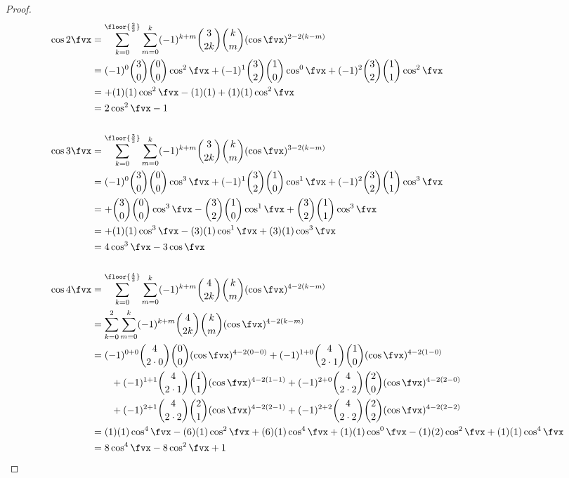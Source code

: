 \begin{proof}
\begin{align*}
  \cos2\fvx
    &= \sum_{k=0}^\floor{\frac{2}{2}}\sum_{m=0}^k      
         (-1)^{k+m} \binom{3}{2k}\binom{k}{m}(\cos\fvx)^{2-2(k-m)}
  \\&= (-1)^0 \binom{3}{0}\binom{0}{0}\cos^2\fvx +
       (-1)^1 \binom{3}{2}\binom{1}{0}\cos^0\fvx +
       (-1)^2 \binom{3}{2}\binom{1}{1}\cos^2\fvx
  \\&= + (1)(1)\cos^2\fvx 
       - (1)(1) 
       + (1)(1)\cos^2\fvx
  \\&= 2\cos^2\fvx -1
\\
\\
  \cos3\fvx
    &= \sum_{k=0}^\floor{\frac{3}{2}}\sum_{m=0}^k      
         (-1)^{k+m} \binom{3}{2k}\binom{k}{m}(\cos\fvx)^{3-2(k-m)}
  \\&= (-1)^0 \binom{3}{0}\binom{0}{0}\cos^3\fvx +
       (-1)^1 \binom{3}{2}\binom{1}{0}\cos^1\fvx +
       (-1)^2 \binom{3}{2}\binom{1}{1}\cos^3\fvx
  \\&= + \binom{3}{0}\binom{0}{0}\cos^3\fvx 
       - \binom{3}{2}\binom{1}{0}\cos^1\fvx 
       + \binom{3}{2}\binom{1}{1}\cos^3\fvx
  \\&= + (1)(1)\cos^3\fvx 
       - (3)(1)\cos^1\fvx 
       + (3)(1)\cos^3\fvx
  \\&= 4\cos^3\fvx - 3\cos\fvx 
\\
\\
  \cos4\fvx
    &= \sum_{k=0}^\floor{\frac{4}{2}}\sum_{m=0}^k      
         (-1)^{k+m} \binom{4}{2k}\binom{k}{m}(\cos\fvx)^{4-2(k-m)}
  \\&= \sum_{k=0}^2 \sum_{m=0}^k      
         (-1)^{k+m} \binom{4}{2k}\binom{k}{m}(\cos\fvx)^{4-2(k-m)}
  \\&=  (-1)^{0+0}\binom{4}{2\cdot0}\binom{0}{0}(\cos\fvx)^{4-2(0-0)}
       +(-1)^{1+0}\binom{4}{2\cdot1}\binom{1}{0}(\cos\fvx)^{4-2(1-0)}
  \\&\qquad
       +(-1)^{1+1}\binom{4}{2\cdot1}\binom{1}{1}(\cos\fvx)^{4-2(1-1)}
       +(-1)^{2+0}\binom{4}{2\cdot2}\binom{2}{0}(\cos\fvx)^{4-2(2-0)}
  \\&\qquad
       +(-1)^{2+1}\binom{4}{2\cdot2}\binom{2}{1}(\cos\fvx)^{4-2(2-1)}
       +(-1)^{2+2}\binom{4}{2\cdot2}\binom{2}{2}(\cos\fvx)^{4-2(2-2)}
  \\&=  (1)(1) \cos^4\fvx
       -(6)(1) \cos^2\fvx
       +(6)(1) \cos^4\fvx
       +(1)(1) \cos^0\fvx
       -(1)(2) \cos^2\fvx
       +(1)(1) \cos^4\fvx
  \\&=  8\cos^4\fvx -8\cos^2\fvx + 1
\\

\end{align*}
\end{proof}
